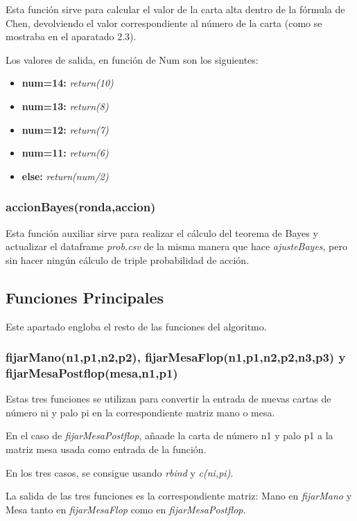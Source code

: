 Esta función sirve para calcular el valor de la carta alta dentro de la fórmula de Chen, devolviendo el valor correspondiente al número de la carta (como se mostraba en el aparatado 2.3). 

Los valores de salida, en función de Num son los siguientes:
\begin{itemize}
	
\item \textbf{num=14:} \textit{return(10)}
\item \textbf{num=13:} \textit{return(8)}
\item \textbf{num=12:} \textit{return(7)}
\item \textbf{num=11:} \textit{return(6)}
\item \textbf{else:} \textit{return(num/2)}

\end{itemize} 

\subsubsection{accionBayes(ronda,accion)}

Esta función auxiliar sirve para realizar el cálculo del teorema de Bayes y actualizar el dataframe \textit{prob.csv} de la misma manera que hace \textit{ajusteBayes}, pero sin hacer ningún cálculo de triple probabilidad de acción.


\subsection{Funciones Principales}

Este apartado engloba el resto de las funciones del algoritmo.
\subsubsection{fijarMano(n1,p1,n2,p2), fijarMesaFlop(n1,p1,n2,p2,n3,p3) y fijarMesaPostflop(mesa,n1,p1)}

Estas tres funciones se utilizan para convertir la entrada de nuevas cartas de número ni y palo pi en la correspondiente matriz mano o mesa. 

En el caso de \textit{fijarMesaPostflop}, añaade la carta de número n1 y palo p1 a la matriz mesa usada como entrada de la función.

En los tres casos, se consigue usando \textit{rbind} y \textit{c(ni,pi)}. 

La salida de las tres funciones es la correspondiente matriz: Mano en \textit{fijarMano} y Mesa tanto en \textit{fijarMesaFlop} como en \textit{fijarMesaPostflop}.

